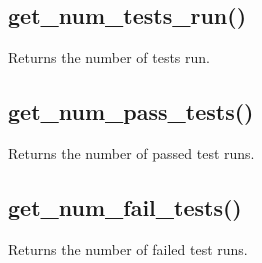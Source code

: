 \documentclass[letterpaper,10pt,english]{sphinxmanual}
\begin{document}
\subsection{get\_num\_tests\_run()}
\label{\detokenize{api:get-num-tests-run}}
\sphinxAtStartPar
Returns the number of tests run.

\begin{sphinxVerbatim}[commandchars=\\\{\}]
\end{sphinxVerbatim}

\sphinxAtStartPar
{}

\begin{sphinxVerbatim}[commandchars=\\\{\}]
  
\end{sphinxVerbatim}


\subsection{get\_num\_pass\_tests()}
\label{\detokenize{api:get-num-pass-tests}}
\sphinxAtStartPar
Returns the number of passed test runs.

\begin{sphinxVerbatim}[commandchars=\\\{\}]
\end{sphinxVerbatim}

\sphinxAtStartPar
{}

\begin{sphinxVerbatim}[commandchars=\\\{\}]
  
\end{sphinxVerbatim}


\subsection{get\_num\_fail\_tests()}
\label{\detokenize{api:get-num-fail-tests}}
\sphinxAtStartPar
Returns the number of failed test runs.

\begin{sphinxVerbatim}[commandchars=\\\{\}]
\end{sphinxVerbatim}
\end{document}
